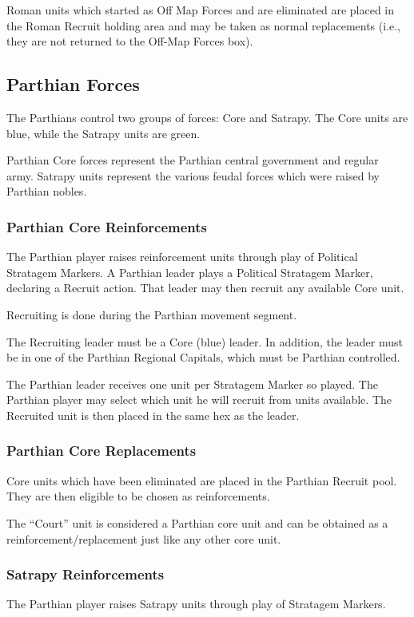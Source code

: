 Roman units which started as Off Map Forces and are eliminated are placed in the Roman Recruit holding area and may be taken as normal replacements (i.e., they are not returned to the Off-Map Forces box).

\subsection{Parthian Forces}

The Parthians control two groups of forces: Core and Satrapy. The Core units are blue, while the Satrapy units are green.

Parthian Core forces represent the Parthian central government and regular army. Satrapy units represent the various feudal forces which were raised by Parthian nobles.

\subsubsection{Parthian Core Reinforcements}

The Parthian player raises reinforcement units through play of Political Stratagem Markers. A Parthian leader plays a Political Stratagem Marker, declaring a Recruit action. That leader may then recruit any available Core unit.

Recruiting is done during the Parthian movement segment.

The Recruiting leader must be a Core (blue) leader. In addition, the leader must be in one of the Parthian Regional Capitals, which must be Parthian controlled.

The Parthian leader receives one unit per Stratagem Marker so played. The Parthian player may select which unit he will recruit from units available. The Recruited unit is then placed in the same hex as the leader.

\subsubsection{Parthian Core Replacements}

Core units which have been eliminated are placed in the Parthian Recruit pool. They are then eligible to be chosen as reinforcements.

The “Court” unit is considered a Parthian core unit and can be obtained as a reinforcement/replacement just like any other core unit.

\subsubsection{Satrapy Reinforcements}
The Parthian player raises Satrapy units through play of Stratagem Markers.

